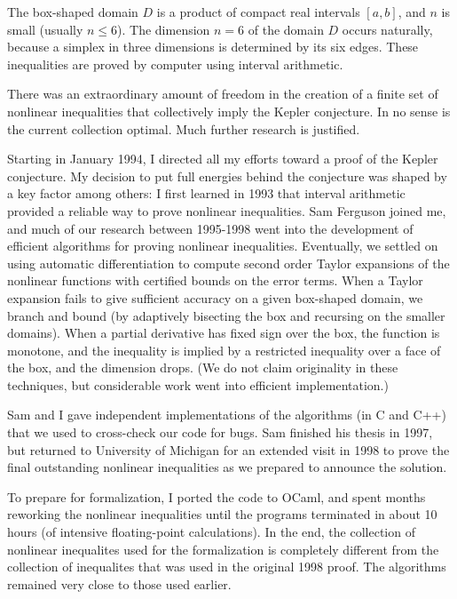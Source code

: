 \documentclass{amsart}
\begin{document}
The box-shaped domain $D$ is a product of compact real intervals
$[a,b]$, and $n$ is small (usually $n\le 6$).  The dimension $n=6$ of
the domain $D$ occurs naturally, because a simplex in three dimensions
is determined by its six edges.  These inequalities are proved by
computer using interval arithmetic.

There was an extraordinary amount of freedom in the creation
of a finite set of nonlinear inequalities that collectively imply
the Kepler conjecture.  In no sense is the current collection
optimal.  Much further research is justified.

Starting in January 1994, I directed all my efforts toward a proof of the
Kepler conjecture.  My decision to put full energies behind the
conjecture was shaped by a key factor among others: I first learned in
1993 that interval arithmetic provided a reliable way to prove
nonlinear inequalities.  Sam Ferguson joined me, and much of our
research between 1995-1998 went into the development of efficient
algorithms for proving nonlinear inequalities.  Eventually, we settled
on using automatic differentiation to compute second order Taylor
expansions of the nonlinear functions with certified bounds on the
error terms.  When a Taylor expansion fails to give sufficient
accuracy on a given box-shaped domain, we branch and bound (by
adaptively bisecting the box and recursing on the smaller domains).
When a partial derivative has fixed sign over the box, the function is
monotone, and the inequality is implied by a restricted inequality
over a face of the box, and the dimension drops.  (We do not claim
originality in these techniques, but considerable work went into
efficient implementation.)

Sam and I gave independent implementations of the algorithms (in C and
C++) that we used to cross-check our code for bugs. Sam finished his
thesis in 1997, but returned to University of Michigan for an
extended visit in 1998 to prove the final outstanding nonlinear
inequalities as we prepared to announce the solution.

To prepare for formalization, I ported the code to OCaml, and spent
months reworking the nonlinear inequalities until the programs
terminated in about 10 hours (of intensive floating-point
calculations).  In the end, the collection of nonlinear inequalites
used for the formalization is completely different from the collection
of inequalites that was used in the original 1998 proof.
The algorithms remained very close to those used earlier.
\end{document}
